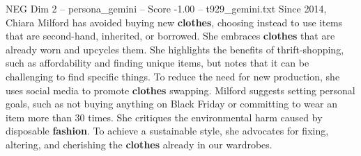 \begin{textsample}{NEG Dim 2 – persona\_gemini – Score -1.00 – t929\_gemini.txt}  \label{ex:f2_neg_002}
Since 2014, Chiara Milford has avoided buying new \textbf{clothes}, choosing instead to use items that are second-hand, inherited, or borrowed.
She embraces \textbf{clothes} that are already worn and upcycles them.
She highlights the benefits of thrift-shopping, such as affordability and finding unique items, but notes that it can be challenging to find specific things.
To reduce the need for new production, she uses social media to promote \textbf{clothes} swapping.
Milford suggests setting personal goals, such as not buying anything on Black Friday or committing to wear an item more than 30 times.
She critiques the environmental harm caused by disposable \textbf{fashion}.
To achieve a sustainable style, she advocates for fixing, altering, and cherishing the \textbf{clothes} already in our wardrobes.

\end{textsample}
